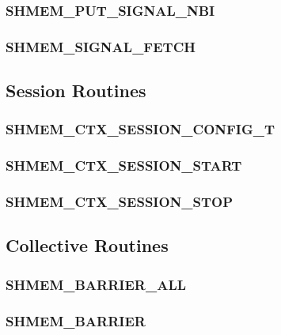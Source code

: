 \documentclass[10pt,oneside]{book}
\begin{document}
\subsubsection{\textbf{SHMEM\_PUT\_SIGNAL\_NBI}}\label{subsec:shmem_put_signal_nbi}


\subsubsection{\textbf{SHMEM\_SIGNAL\_FETCH}}\label{subsec:shmem_signal_fetch}



\subsection{Session Routines}\label{subsec:sessions}


\subsubsection{\textbf{SHMEM\_CTX\_SESSION\_CONFIG\_T}}\label{subsec:shmem_ctx_session_config_t}


\subsubsection{\textbf{SHMEM\_CTX\_SESSION\_START}}\label{subsec:shmem_ctx_session_start}


\subsubsection{\textbf{SHMEM\_CTX\_SESSION\_STOP}}\label{subsec:shmem_ctx_session_stop}



\subsection{Collective Routines}\label{subsec:coll}


\subsubsection{\textbf{SHMEM\_BARRIER\_ALL}}\label{subsec:shmem_barrier_all}


\subsubsection{\textbf{SHMEM\_BARRIER}}\label{subsec:shmem_barrier}

\end{document}
